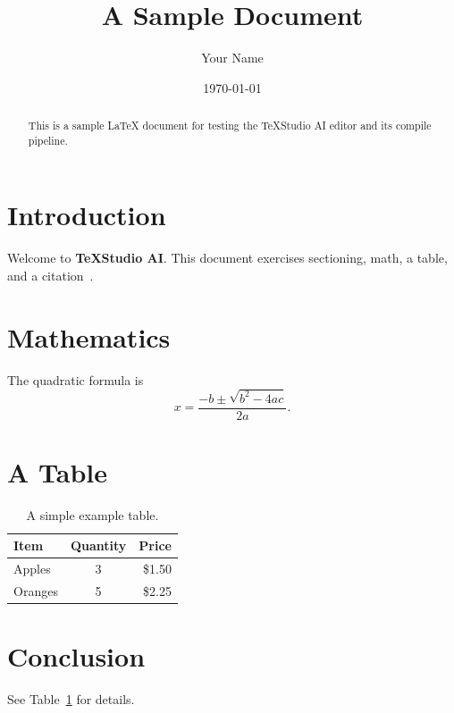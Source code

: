 \documentclass{article}
\title{A Sample Document}
\author{Your Name}
\date{\today}
\begin{document}
\maketitle

\begin{abstract}
This is a sample LaTeX document for testing the TeXStudio AI editor and its
compile pipeline.
\end{abstract}

\section{Introduction}
Welcome to \textbf{TeXStudio AI}. This document exercises sectioning, math, a
table, and a citation~\cite{knuth1984}.

\section{Mathematics}
The quadratic formula is
\begin{equation}
    x = \frac{-b \pm \sqrt{b^2 - 4ac}}{2a}.
\end{equation}

\section{A Table}
\begin{table}[h]
\centering
\begin{tabular}{|l|c|r|}
\hline
Item & Quantity & Price \\
\hline
Apples  & 3 & \$1.50 \\
Oranges & 5 & \$2.25 \\
\hline
\end{tabular}
\caption{A simple example table.}
\label{tab:example}
\end{table}

\section{Conclusion}
See Table~\ref{tab:example} for details.



\end{document}
